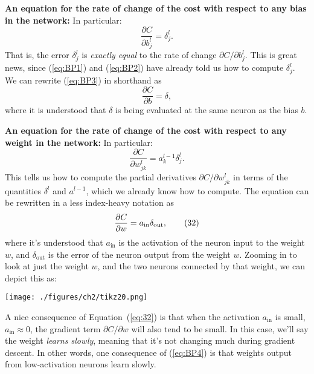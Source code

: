 \documentclass[a4paper,twoside,10pt]{book}
\begin{document}
\textbf{An equation for the rate of change of the cost with respect to any bias in the network:} In particular:
\begin{equation}
\frac{\partial C}{\partial b^l_j} = \delta^l_j.
\tag{BP3}\label{eq:BP3}
\end{equation}
That is, the error $\delta^l_j$ is \textit{exactly equal} to the rate of change $\partial{}C/\partial{}b^l_j$. This is great news, since (\ref{eq:BP1}) and (\ref{eq:BP2}) have already told us how to compute $\delta^l_j$. We can rewrite (\ref{eq:BP3}) in shorthand as
\begin{equation}
\frac{\partial C}{\partial b} = \delta,\tag{31}\label{eq:31}
\end{equation}
where it is understood that $\delta$ is being evaluated at the same neuron as the bias $b$.

\textbf{An equation for the rate of change of the cost with respect to any weight in the network:} In particular:
\begin{equation}
\frac{\partial C}{\partial w^l_{jk}} = a^{l-1}_k \delta^l_j.
\tag{BP4}\label{eq:BP4}
\end{equation}
This tells us how to compute the partial derivatives $\partial{}C/\partial{}w^l_{jk}$ in terms of the quantities $\delta^l$ and $a^{l-1}$, which we already know how to compute. The equation can be rewritten in a less index-heavy notation as
\begin{equation}
\frac{\partial C}{\partial w} = a_{\rm in} \delta_{\rm out},
\tag{32}\label{eq:32}
\end{equation}
where it's understood that $a_\mathrm{in}$ is the activation of the neuron input to the weight $w$, and $\delta_\mathrm{out}$ is the error of the neuron output from the weight $w$. Zooming in to look at just the weight $w$, and the two neurons connected by that weight, we can depict this as:

\begin{center}
	\texttt{[image: ./figures/ch2/tikz20.png]}
\end{center}
A nice consequence of Equation~(\ref{eq:32}) is that when the activation $a_\mathrm{in}$ is small, $a_\mathrm{in}\approx0$, the gradient term $\partial{}C/\partial{}w$ will also tend to be small. In this case, we'll say the weight \textit{learns slowly}, meaning that it's not changing much during gradient descent. In other words, one consequence of (\ref{eq:BP4}) is that weights output from low-activation neurons learn slowly.
\end{document}
